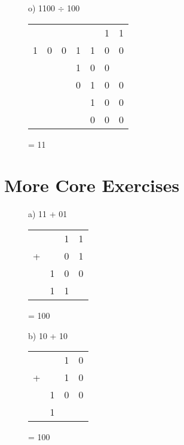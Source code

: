 \begin{figure}[H]
    \begin{minipage}[t]{0.45\textwidth}
        o) 1100 $\div$ 100
        \begin{table}[H]
            \centering
            \begin{tabularx}{0.6\linewidth}{XXXXXXX}
                  &   &   &   &   & 1 & 1 \\
                \cline{4-7}
                1 & 0 & 0 & \multicolumn{1}{|X}{1} & 1 & 0 & 0 \\
                  &   &   & 1 & 0 & 0 &   \\
                \cline{4-6}
                  &   &   & 0 & 1 & 0 & 0  \\
                  &   &   &   & 1 & 0 & 0 \\
                \cline{5-7}
                  &   &   &   & 0 & 0 & 0 \\
            \end{tabularx}
        \end{table}
        = 11
    \end{minipage}\hfill
    \begin{minipage}[t]{0.45\textwidth}

    \end{minipage}\hfill
\end{figure}

\section*{More Core Exercises}
\begin{figure}[H]
    \begin{minipage}[t]{0.45\textwidth}
        a) 11 + 01
        \begin{table}[H]
            \centering
            \begin{tabularx}{0.5\linewidth}{rXXX}
                & & 1 & 1\\
                + & & 0 & 1\\
                \cline{2-4}
                & 1 & 0 & 0 \\
                \cline{2-4}
                & 1 & 1 &
            \end{tabularx}
        \end{table}
        = 100
    \end{minipage}\hfill
    \begin{minipage}[t]{0.45\textwidth}
        b) 10 + 10
        \begin{table}[H]
            \centering
            \begin{tabularx}{0.5\linewidth}{rXXX}
                & & 1 & 0\\
                + & & 1 & 0\\
                \cline{2-4}
                & 1 & 0 & 0 \\
                \cline{2-4}
                & 1 &  &
            \end{tabularx}
        \end{table}
        = 100
    \end{minipage}\hfill
\end{figure}

